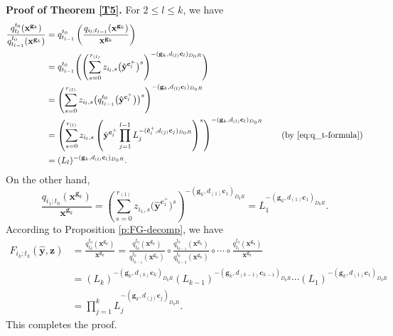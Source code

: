 \documentclass[pdftex]{sigma}
\numberwithin{equation}{section}
\begin{document}
{\bf Proof of Theorem \ref{T5}.}
For $2\leq l\leq k$, we have
\begin{align*}
 \frac{q_{t_{l}}^{t_0}(\mathbf{x}^{\mathbf{g}_k})}{q_{t_{l-1}}^{t_0}(\mathbf{x}^{\mathbf{g}_k})}
 &=q_{t_{l-1}}^{t_0}\left(\frac{q_{i_l;t_{l-1}}(\mathbf{x}^{\mathbf{g}_k})}{\mathbf{x}^{\mathbf{g}_k}}\right)\\
 &=q_{t_{l-1}}^{t_0}\Biggl(\left(\sum\limits_{s=0}^{r_{(l)}}z_{i_l,s}\bigl(\hat{\mathbf{y}}^{\mathbf{c}_{l}^+}\bigr)^s\right)^{-(\mathbf{g}_{k},d_{(l)}\mathbf{c}_{l})_{D_0R}}\Biggr)\\
 &=\left(\sum\limits_{s=0}^{r_{(l)}}z_{i_l,s}\bigl(q_{t_{l-1}}^{t_0}\bigl(\hat{\mathbf{y}}^{\mathbf{c}_{l}^+}\bigr)\bigr)^s\right)^{-(\mathbf{g}_{k},d_{(l)}\mathbf{c}_{l})_{D_0R}}\\
 &=\left(\sum\limits_{s=0}^{r_{(l)}}z_{i_l,s}\left(\hat{\mathbf{y}}^{\mathbf{c}_{l}^+}\prod\limits_{j=1}^{l-1}L_j^{-(\mathbf{\hat{c}}_{l}^+,d_{(j)}\mathbf{c}_{j})_{D_0R}}\right)^s\right)^{-(\mathbf{g}_{k},d_{(l)}\mathbf{c}_{l})_{D_0R}} \qquad (\text{by \eqref{eq:q_t-formula}})\\
 &=(L_l)^{-(\mathbf{g}_{k},d_{(l)}\mathbf{c}_{l})_{D_0R}}.
\end{align*}
On the other hand, \[\frac{q_{i_1;t_0}(\mathbf{x}^{\mathbf{g}_{k}})}{\mathbf{x}^{\mathbf{g}_{k}}}=\left(\sum\limits_{s=0}^{r_{(1)}}z_{i_1,s}\bigl(\hat{\mathbf{y}}^{\mathbf{c}_{1}^+}\bigr)^s\right)^{-(\mathbf{g}_{k},d_{(1)}\mathbf{c}_{1})_{D_0R}}=L_1^{-(\mathbf{g}_{k},d_{(1)}\mathbf{c}_{1})_{D_0R}}.\]
According to Proposition \ref{p:FG-decomp}, we have
\begin{align*}
 F_{i_k;t_k}(\hat{\mathbf{y}},\mathbf{z})&=\frac{q_{t_k}^{t_0}(\mathbf{x}^{\mathbf{g}_{k}})}{\mathbf{x}^{\mathbf{g}_k}}=\frac{q_{t_k}^{t_0}(\mathbf{x}^{\mathbf{g}_{k}})}{q_{t_{k-1}}^{t_0}(\mathbf{x}^{\mathbf{g}_{k}})}\circ\frac{q_{t_{k-1}}^{t_0}(\mathbf{x}^{\mathbf{g}_{k}})}{q_{t_{k-2}}^{t_0}(\mathbf{x}^{\mathbf{g}_{k}})}\circ\cdots\circ\frac{q_{t_1}^{t_0}(\mathbf{x}^{\mathbf{g}_{k}})}{\mathbf{x}^{\mathbf{g}_{k}}}\\
 &=(L_k)^{-(\mathbf{g}_{k},d_{(k)}\mathbf{c}_{k})_{D_0R}}(L_{k-1})^{-(\mathbf{g}_{k},d_{(k-1)}\mathbf{c}_{k-1})_{D_0R}}\cdots(L_1)^{-(\mathbf{g}_{k},d_{(1)}\mathbf{c}_{1})_{D_0R}}\\
 &=\prod\limits_{j=1}^{k}L_j^{-(\mathbf{g}_{k},d_{(j)}\mathbf{c}_{j})_{D_0R}}.
\end{align*}
This completes the proof. \hfill \qedsymbol
\end{document}

